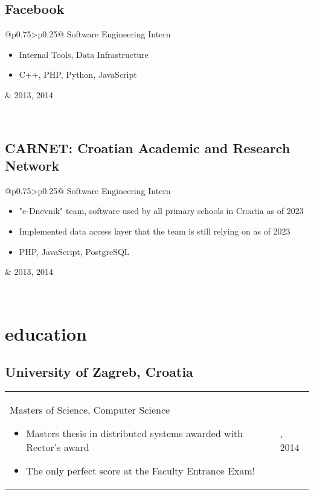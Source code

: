 \documentclass[a4paper]{article}
\makeatletter
\newlength{\tablewidth}
\newenvironment{period}[2]{%
\newcommand{\sarma}{#2}%
\setlength{\tablewidth}{\linewidth}
\addtolength{\tablewidth}{-2\tabcolsep}
\begin{tabular}{@{}p{0.75\tablewidth}>{\raggedleft\arraybackslash}p{0.25\tablewidth}@{}}%
#1 \newline
\begin{itemize}
}{%
\end{itemize} & \sarma \\%
\end{tabular}\\
}
\makeatother
\begin{document}
\subsection{Facebook}
\begin{period}{Software Engineering Intern}{2013, 2014}
    \item Internal Tools, Data Infrastructure
    \item C++, PHP, Python, JavaScript
\end{period}

\subsection{CARNET: Croatian Academic and Research Network}
\begin{period}{Software Engineering Intern}{2010 - 2013}
    \item "e-Dnevnik" team, software used by all primary schools in Croatia as of 2023
    \item Implemented data access layer that the team is still relying on as of 2023
    \item PHP, JavaScript, PostgreSQL
\end{period}

\section{education}
\subsection{University of Zagreb, Croatia}
\begin{period}{Masters of Science, Computer Science}{2008 -- 2013}
    \item Masters thesis in distributed systems awarded with Rector's award
    \item The only perfect score at the Faculty Entrance Exam!
\end{period}
\end{document}
